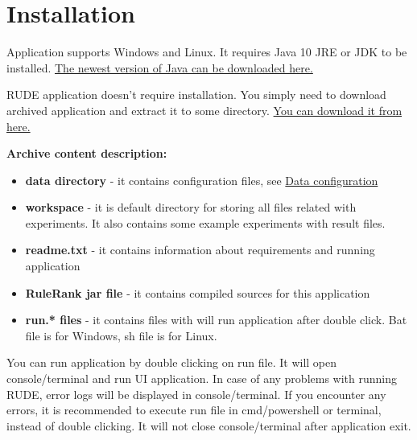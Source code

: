 \section{Installation}\label{section:install}

Application supports Windows and Linux. It requires Java 10 JRE or JDK to be installed. \href{http://www.oracle.com/technetwork/java/javase/downloads/index.html}{The newest version of Java can be downloaded here.} 

RUDE application doesn't require installation. You simply need to download archived application and extract it to some directory. \href{http://www.cs.put.poznan.pl/mszelag/Software/ruleRank/ruleRank.html}{You can download it from here.}\newline

\textbf{Archive content description:}
\begin{itemize}
	\item \textbf{data directory} - it contains configuration files, see \hyperref[section:data-config]{Data configuration}
	\item \textbf{workspace} - it is default directory for storing all files related with experiments. It also contains some example experiments with result files.
	\item \textbf{readme.txt} - it contains information about requirements and running application
	\item \textbf{RuleRank jar file} - it contains compiled sources for this application
	\item \textbf{run.* files} - it contains files with will run application after double click. Bat file is for Windows, sh file is for Linux.
\end{itemize}

You can run application by double clicking on run file. It will open console/terminal and run UI application. In case of any problems with running RUDE, error logs will be displayed in console/terminal. If you encounter any errors, it is recommended to execute run file in cmd/powershell or terminal, instead of double clicking. It will not close console/terminal after application exit.


\vfill\newpage
